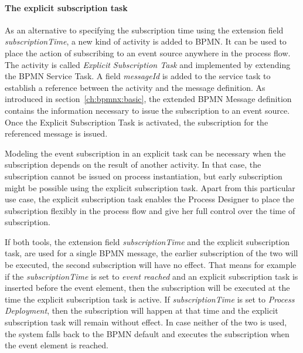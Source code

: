 \paragraph{The explicit subscription task\newline}
As an alternative to specifying the subscription time using the extension field \textit{subscriptionTime}, a new kind of activity is added to BPMN. It can be used to place the action of subscribing to an event source anywhere in the process flow.
The activity is called \textit{Explicit Subscription Task} and implemented by extending the BPMN Service Task. A field \textit{messageId} is added to the service task to establish a reference between the activity and the message definition.
As introduced in section~\autoref{ch:bpmnx:basic}, the extended BPMN Message definition contains the information necessary to issue the subscription to an event source.
Once the Explicit Subscription Task is activated, the subscription for the referenced message is issued. 

Modeling the event subscription in an explicit task can be necessary when the subscription depends on the result of another activity. In that case, the subscription cannot be issued on process instantiation, but early subscription might be possible using the explicit subscription task.
Apart from this particular use case, the explicit subscription task enables the Process Designer to place the subscription flexibly in the process flow and give her full control over the time of subscription.



If both tools, the extension field \textit{subscriptionTime} and the explicit subscription task, are used for a single BPMN message, the earlier subscription of the two will be executed, the second subscription will have no effect.
That means for example if the \textit{subscriptionTime} is set to \textit{event reached} and an explicit subscription task is inserted before the event element, then the subscription will be executed at the time the explicit subscription task is active.
If \textit{subscriptionTime} is set to \textit{Process Deployment}, then the subscription will happen at that time and the explicit subscription task will remain without effect.
In case neither of the two is used, the system falls back to the BPMN default and executes the subscription when the event element is reached.

